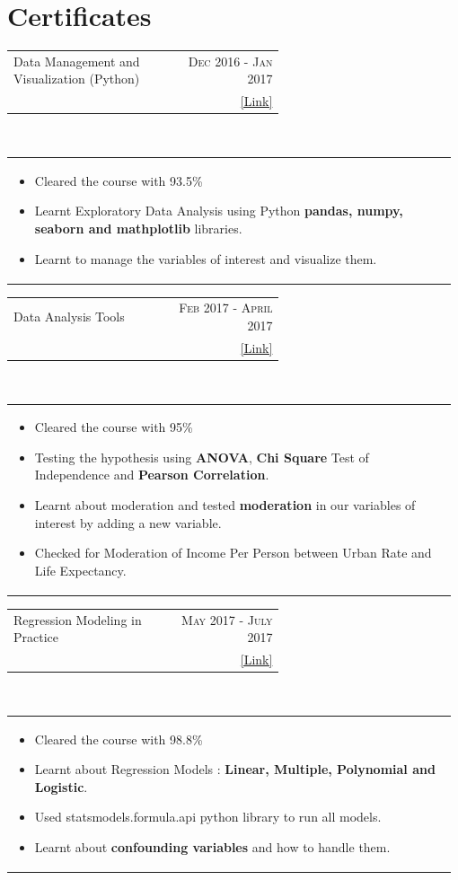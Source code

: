 \documentclass[a4paper]{article} %
\newcommand{\verticalspacing}{-0.25cm}
\newcommand{\bulletspace}{0.7cm}
\newcommand{\projectheadspacing}{6.9cm}
\newcommand{\cproject}[5]{%
    \begin{tabular}{p{0.60\linewidth}r}
        \textcolor{NavyBlue}{\small #2} & \multicolumn{1}{m{ \projectheadspacing{} }}{\raggedleft \small {\textsc{#1}}}\\
        \small {#3} & \small {#4}
    \end{tabular}\\
    \begin{tabular}{p{0.98\linewidth}}
    \vspace{-0.3cm}
        \small{#5}
    \end{tabular}
    \vspace{\verticalspacing{}}
}
\begin{document}
 \section{Certificates}

\cproject
    {Dec 2016 - Jan 2017}
    {Data Management and Visualization (Python)}
    {\textsc{\raggedright Data Analysis, Coursera}}
    {\href{https://www.coursera.org/account/accomplishments/certificate/BKFTEPR83L8Y} {[Link]}}
    {%
        \begin{itemize}[leftmargin=\bulletspace{}]
            \item Cleared the course with 93.5\%
            \item Learnt Exploratory Data Analysis using Python \textbf{pandas, numpy, seaborn and mathplotlib} libraries.
            \item Learnt to manage the variables of interest and visualize them.
        \end{itemize}
    }

\cproject
    {Feb 2017 - April 2017}
    {Data Analysis Tools}
    {\textsc{\raggedright Statistics, Coursera}}
    {\href{https://www.coursera.org/account/accomplishments/certificate/EM29BAUXMCVT} {[Link]}}
    {%
        \begin{itemize}[leftmargin=\bulletspace{}]
            \item Cleared the course with 95\%
            \item Testing the hypothesis using \textbf{ANOVA}, \textbf{Chi Square} Test of Independence and \textbf{Pearson Correlation}.
            \item Learnt about moderation and tested \textbf{moderation} in our variables of interest by adding a new variable.
            \item Checked for Moderation of Income Per Person between Urban Rate and Life Expectancy.
        \end{itemize}
    }

\cproject
    {May 2017 - July 2017}
    {Regression Modeling in Practice}
    {\textsc{\raggedright Analytics, Coursera}}
    {\href{https://www.coursera.org/account/accomplishments/certificate/QNG3Q8RJRZUX} {[Link]}}
    {%
        \begin{itemize}[leftmargin=\bulletspace{}]
            \item Cleared the course with 98.8\%
            \item Learnt about Regression Models : \textbf{Linear, Multiple, Polynomial and Logistic}.
            \item Used statsmodels.formula.api python library to run all models.
            \item Learnt about \textbf{confounding variables} and how to handle them.
        \end{itemize}
    }
\end{document}
